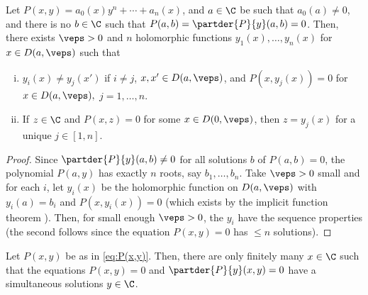 \documentclass[11pt]{report}
\begin{document}
\begin{lem}
    Let $P(x,y) = a_0(x)y^n+\cdots + a_n(x)$, and $a \in \C$ be such that $a_0(a) \neq 0$, and there is no $b \in \C$ such that $P(a,b) = \partder{P}{y}(a,b)=0$. Then, there exists $\veps >0$ and $n$ holomorphic functions $y_1(x),\dots,y_n(x)$ for $x \in D(a,\veps)$ such that
    \begin{enumerate}[(i)]
        \item $y_i(x) \neq y_j(x')$ if $i \neq j$, $x,x' \in D(a,\veps)$, and $P(x,y_j(x))=0$ for $x \in D(a,\veps),$ $j=1,\dots,n$.
        \item If $z \in \C$ and $P(x,z)=0$ for some $x \in D(0,\veps)$, then $z = y_j(x)$ for a unique $j \in [1,n]$.
    \end{enumerate}
\end{lem}

\begin{proof}
    Since $\partder{P}{y}(a,b) \neq 0$ for all solutions $b$ of $P(a,b)=0$, the polynomial $P(a,y)$ has exactly $n$ roots, say $b_1,\dots,b_n$. Take $\veps>0$ small and for each $i$, let $y_i(x)$ be the holomorphic function on $D(a,\veps)$ with $y_i(a) = b_i$ and $P(x,y_i(x))=0$ (which exists by the implicit function theorem ). Then, for small enough $\veps>0$, the $y_i$ have the sequence properties (the second follows since the equation $P(x,y)=0$ has $\leq n$ solutions).
\end{proof}

\begin{prop}[][label=prop:simsolutions]
    Let $P(x,y)$ be as in \eqref{eq:P(x,y)}. Then, there are only finitely many $x \in \C$ such that the equations $P(x,y)=0$ and $\partder{P}{y}(x,y)=0$ have a simultaneous solutions $y\in \C$.
\end{prop}
\end{document}
